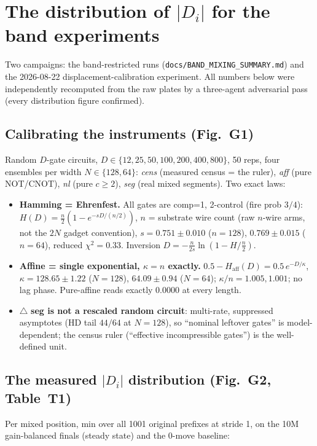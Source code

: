 \documentclass[11pt]{article}
\newcommand{\code}[1]{\texttt{#1}}
\newcommand{\Di}{\lvert D_i\rvert}
\begin{document}
\section{The distribution of $\Di$ for the band experiments}
Two campaigns: the band-restricted runs (\code{docs/BAND\_MIXING\_SUMMARY.md}) and the 2026-08-22
displacement-calibration experiment. All numbers below were independently recomputed from the raw
plates by a three-agent adversarial pass (every distribution figure confirmed).

\subsection{Calibrating the instruments (Fig.~G1)}
Random $D$-gate circuits, $D\in\{12,25,50,100,200,400,800\}$, 50 reps, four ensembles per width
$N\in\{128,64\}$: \emph{cens} (measured census = the ruler), \emph{aff} (pure NOT/CNOT), \emph{nl}
(pure $c\ge2$), \emph{seg} (real mixed segments). Two exact laws:
\begin{itemize}
\item \textbf{Hamming = Ehrenfest.} All gates are comp=1, 2-control (fire prob $3/4$):
$H(D)=\tfrac n2(1-e^{-sD/(n/2)})$, $n$ = substrate wire count (raw $n$-wire arms, not the $2N$
gadget convention), $s=0.751\pm0.010$ ($n{=}128$), $0.769\pm0.015$ ($n{=}64$),
reduced $\chi^2=0.33$. Inversion $D=-\tfrac{n}{2s}\ln(1-H/\tfrac n2)$.
\item \textbf{Affine = single exponential, $\kappa=n$ exactly.}
$0.5-H_{\mathrm{aff}}(D)=0.5\,e^{-D/\kappa}$, $\kappa=128.65\pm1.22$ ($N{=}128$), $64.09\pm0.94$
($N{=}64$); $\kappa/n=1.005,1.001$; no lag phase. Pure-affine reads exactly $0.0000$ at every length.
\item $\triangle$ \textbf{seg is not a rescaled random circuit}: multi-rate, suppressed asymptotes (HD
tail $44/64$ at $N{=}128$), so ``nominal leftover gates'' is model-dependent; the census ruler
(``effective incompressible gates'') is the well-defined unit.
\end{itemize}

\subsection{The measured $\Di$ distribution (Fig.~G2, Table~T1)}
Per mixed position, min over all 1001 original prefixes at stride 1, on the 10M gain-balanced finals
(steady state) and the 0-move baseline:
\end{document}
